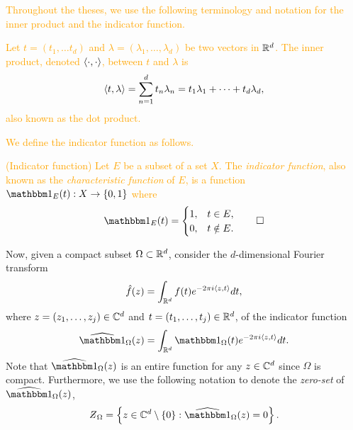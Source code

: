 \documentclass[../thesis.tex]{subfiles}
\begin{document}
\textcolor{orange}{  %
Throughout the theses, we use the following terminology and notation for the inner product and the indicator function.
\begin{definition}\label{def:dot_prod}
    Let $t=(t_1,\dots t_d)$ and $\lambda=(\lambda_1, \dots, \lambda_d)$ be two vectors in $\mathbb{R}^d$. The inner product, denoted $\langle\cdot, \cdot\rangle$, between $t$ and $\lambda$ is
    \begin{equation*}
        \left \langle t, \lambda \right \rangle = \sum_{n=1}^d t_n \lambda_n = t_1\lambda_1 + \dots + t_d\lambda_d,
    \end{equation*}
    also known as the dot product. 
\end{definition}
} %

\textcolor{orange}{  %
We define the indicator function as follows. 
\begin{definition}(Indicator function)\label{def:indicator}
    Let $E$ be a subset of a set $X$. The \emph{indicator function}, also known as the \emph{characteristic function} of $E$, is a function $\indicator{E}{t}: X \rightarrow \braq{0,1}$ where
    \begin{equation*}
        \indicator{E}{t}  = 
        \begin{cases} 
            1, &  t\in E,\\
            0, &  t \notin E.
        \end{cases}
        \qedhere
    \end{equation*}
\end{definition}
} %

Now, given a compact subset $\Omega\subset \mathbb{R}^d$, consider the $d$-dimensional Fourier transform 
\begin{equation*}
    \hat{f}(z) = \int_{\mathbb{R}^d} f(t)  e^{-2\pi i \langle z,t\rangle} dt,
\end{equation*}
where $z = (z_1, \dots, z_j) \in \mathbb{C}^d$ and $t = (t_1, \dots, t_j) \in \mathbb{R}^d$, of the indicator function
\begin{equation*}
    \indicatorFourier{\Omega}{z} = \int_{\R^d} \indicator{\Omega}{t}  e^{-2\pi i \braa{z,t}} dt.
\end{equation*} 
Note that $\indicatorFourier{\Omega}{z}$ is an entire function for any $z\in \mathbb{C}^d$ since $\Omega$ is compact. %
Furthermore, we use the following notation to denote the \emph{zero-set} of $\indicatorFourier{\Omega}{z}$,
\begin{equation*}
    \Zstroke_{\Omega} = \braqMed{ z \in \C^d \setminus \braqMed{0} : \indicatorFourier{\Omega}{z} = 0}.
\end{equation*}
\end{document}
